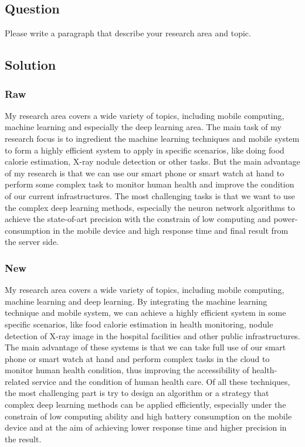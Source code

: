 \documentclass{article}
\begin{document}
\subsection{Question}
Please write a paragraph that describe your research area and topic.

\subsection{Solution}

\subsubsection{Raw}
My research area covers a wide variety of topics, including mobile computing, machine learning and especially the deep learning area. The main task of my research focus is to ingredient the machine learning techniques and mobile system to form a highly efficient system to apply in specific scenarios, like doing food calorie estimation, X-ray nodule detection or other tasks. But the main advantage of my research is that we can use our smart phone or smart watch at hand to perform some complex task to monitor human health and improve the condition of our current infrastructures. The most challenging tasks is that we want to use the complex deep learning methods, especially the neuron network algorithms to achieve the state-of-art precision with the constrain of low computing and power-consumption in the mobile device and high response time and final result from the server side.


\subsubsection{New}
My research area covers a wide variety of topics, including mobile computing, machine learning and deep learning. By integrating the machine learning technique and mobile system, we can achieve a highly efficient system in some specific scenarios, like food calorie estimation in health monitoring, nodule detection of X-ray image in the hospital facilities and other public infrastructures. The main advantage of these systems is that we can take full use of our smart phone or smart watch at hand and perform complex tasks in the cloud to monitor human health condition, thus improving the accessibility of health-related service and the condition of human health care. Of all these techniques, the most challenging part is try to design an algorithm or a strategy that complex deep learning methods can be applied efficiently, especially under the constrain of low computing ability and high battery consumption on the mobile device and at the aim of achieving lower response time and higher precision in the result.
\end{document}
